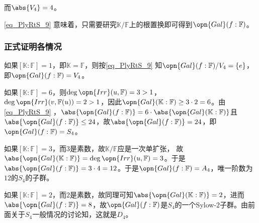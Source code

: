 而$\abs{V_4}=4$。

\autoref{eq_PlyRtS_9} 意味着，只需要研究$\mathbb{K}/\mathbb{F}$上的根置换即可得到$\opn{Gal}(f:\mathbb{F})$。

\subsubsection{正式证明各情况}

如果$[\mathbb{K}:\mathbb{F}]=1$，即$\mathbb{K}=\mathbb{F}$，则按\autoref{eq_PlyRtS_9} 知$\opn{Gal}(f:\mathbb{F})/V_4=\{e\}$，即$\opn{Gal}(f:\mathbb{F})=V_4$。

如果$[\mathbb{K}:\mathbb{F}]=6$，则$\deg\opn{Irr}(u, \mathbb{F})=3>1$，$\deg\opn{Irr}(v, \mathbb{F}(u))=2>1$，因此$\opn{Gal}(\mathbb{K}:\mathbb{F})\geq 3\cdot 2 =6$。由\autoref{eq_PlyRtS_9} ，$\abs{\opn{Gal}(f:\mathbb{F})}=6\cdot\abs{\opn{Gal}(\mathbb{K}:\mathbb{F})}$且$\abs{\opn{Gal}(f:\mathbb{F})}\leq 24$，故$\abs{\opn{Gal}(f:\mathbb{F})}=24$，即$\opn{Gal}(f:\mathbb{F})=S_4$。

如果$[\mathbb{K}:\mathbb{F}]=3$，而$3$是素数，故$\mathbb{K}/\mathbb{F}$应是一次单扩张，%
故$\abs{\opn{Gal}(\mathbb{K}:\mathbb{F})}=\deg\opn{Irr}(u, \mathbb{F})=3$。于是$\abs{\opn{Gal}(f:\mathbb{F})}=3\cdot 4=12$。于是$\opn{Gal}(f:\mathbb{F})=A_4$，唯一阶数为$12$的$S_4$的子群。

如果$[\mathbb{K}:\mathbb{F}]=2$，而$2$是素数，故同理可知$\abs{\opn{Gal}(\mathbb{K}:\mathbb{F})}=2$，进而$\abs{\opn{Gal}(f:\mathbb{F})}=8$，故$\opn{Gal}(f:\mathbb{F})$是$S_4$的一个Sylow-$2$子群。由前面关于$S_4$一般情况的讨论知，这就是$D_4$。







